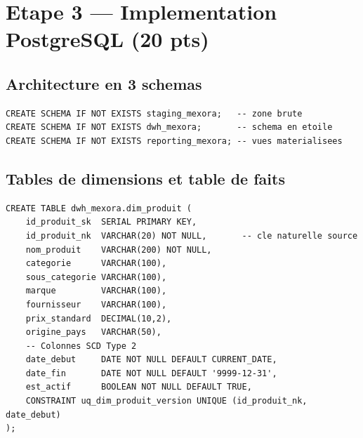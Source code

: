 \documentclass[12pt,a4paper]{article}
\begin{document}
\newpage

\section{Etape 3 --- Implementation PostgreSQL (20 pts)}

\subsection{Architecture en 3 schemas}

\begin{lstlisting}[style=sql, caption=Creation des schemas PostgreSQL]
CREATE SCHEMA IF NOT EXISTS staging_mexora;   -- zone brute
CREATE SCHEMA IF NOT EXISTS dwh_mexora;       -- schema en etoile
CREATE SCHEMA IF NOT EXISTS reporting_mexora; -- vues materialisees
\end{lstlisting}

\subsection{Tables de dimensions et table de faits}

\begin{lstlisting}[style=sql, caption=DIM\_PRODUIT avec colonnes SCD Type 2]
CREATE TABLE dwh_mexora.dim_produit (
    id_produit_sk  SERIAL PRIMARY KEY,
    id_produit_nk  VARCHAR(20) NOT NULL,       -- cle naturelle source
    nom_produit    VARCHAR(200) NOT NULL,
    categorie      VARCHAR(100),
    sous_categorie VARCHAR(100),
    marque         VARCHAR(100),
    fournisseur    VARCHAR(100),
    prix_standard  DECIMAL(10,2),
    origine_pays   VARCHAR(50),
    -- Colonnes SCD Type 2
    date_debut     DATE NOT NULL DEFAULT CURRENT_DATE,
    date_fin       DATE NOT NULL DEFAULT '9999-12-31',
    est_actif      BOOLEAN NOT NULL DEFAULT TRUE,
    CONSTRAINT uq_dim_produit_version UNIQUE (id_produit_nk, date_debut)
);
\end{lstlisting}
\end{document}
